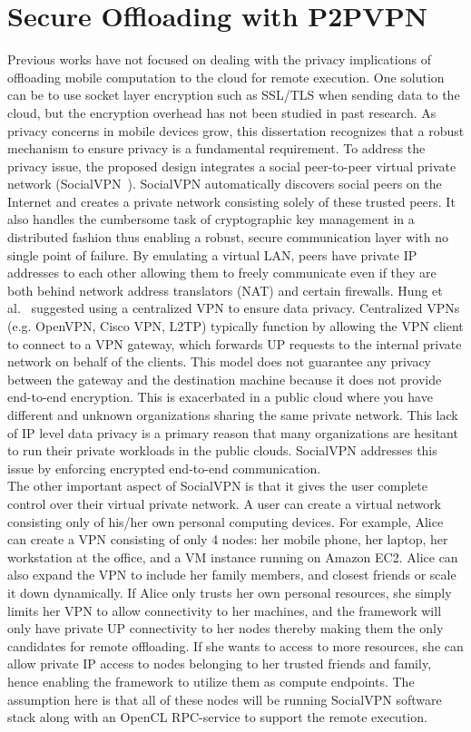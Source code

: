 \section{Secure Offloading with P2PVPN}
\label{back:p2pvpn}
Previous works have not focused on dealing with the privacy implications
of offloading mobile computation to the cloud for remote execution.
%
One solution can be to use socket layer encryption such as SSL/TLS when
sending data to the cloud, but the encryption overhead has not been
studied in past research.
%
As privacy concerns in mobile devices grow, this dissertation
recognizes that a robust mechanism to ensure privacy is a fundamental
requirement.
%
To address the privacy issue, the proposed design integrates a social
peer-to-peer virtual private network (SocialVPN~\cite{socialvpn}).
%
SocialVPN automatically discovers social peers on the Internet and
creates a private network consisting solely of these trusted peers.
%
It also handles the cumbersome task of cryptographic key management in a
distributed fashion thus enabling a robust, secure communication layer
with no single point of failure.
%
By emulating a virtual LAN, peers have private IP addresses to each
other allowing them to freely communicate even if they are both behind
network address translators (NAT) and certain firewalls.
%
Hung et al.~\cite{hung} suggested using a centralized VPN to ensure data
privacy.
%
Centralized VPNs (e.g. OpenVPN, Cisco VPN, L2TP) typically function by
allowing the VPN client to connect to a VPN gateway, which forwards UP
requests to the internal private network on behalf of the clients.
%
This model does not guarantee any privacy between the gateway and the
destination machine because it does not provide end-to-end encryption.
%
This is exacerbated in a public cloud where you have different and
unknown organizations sharing the same private network.
%
This lack of IP level data privacy is a primary reason that many
organizations are hesitant to run their private workloads in the public
clouds\cite{brodkin}.
%
SocialVPN addresses this issue by enforcing encrypted end-to-end
communication.\\
%
The other important aspect of SocialVPN is that it gives the user
complete control over their virtual private network.
%
A user can create a virtual network consisting only of his/her own
personal computing devices.
%
For example, Alice can create a VPN consisting of only 4 nodes: her
mobile phone, her laptop, her workstation at the office, and a VM
instance running on Amazon EC2.
%
Alice can also expand the VPN to include her family members, and closest
friends or scale it down dynamically.
%
If Alice only trusts her own personal resources, she simply limits her
VPN to allow connectivity to her machines, and the framework will only
have private UP connectivity to her nodes thereby making them the only
candidates for remote offloading.
%
If she wants to access to more resources, she can allow private IP
access to nodes belonging to her trusted friends and family, hence
enabling the framework to utilize them  as compute endpoints.
%
The assumption here is that all of these nodes will be running SocialVPN
software stack along with an OpenCL RPC-service to support the remote
execution.
%
